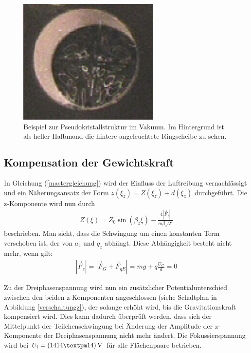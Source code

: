 \documentclass[a4paper,12pt]{article}
\begin{document}
\begin{figure}[htb]
		\centering
		\includegraphics{pseudo_kristall.png}
		\caption{Beispiel zur Pseudokristallstruktur im Vakuum. Im Hintergrund ist als heller Halbmond die hintere angeleuchtete Ringscheibe zu sehen.}
		\label{pseudokristall}
\end{figure}


\subsection{Kompensation der Gewichtskraft}\label{sec:kompensation}
In Gleichung (\ref{mastergleichung}) wird der Einfluss der Luftreibung vernachlässigt und ein Näherungsansatz der Form $z(ξ_z) = Z(ξ_z)+d(ξ_z)$ durchgeführt.
Die z-Komponente wird nun durch
\begin{align*}
	Z(ξ) = Z_0\sin(β_zξ) - \frac{4|\vec{F}_z|}{mβ_zΩ^2}
\end{align*}
beschrieben.
Man sieht, dass die Schwingung um einen konstanten Term verschoben ist, der von $a_z$ und $q_z$ abhängt.
Diese Abhängigkeit besteht nicht mehr, wenn gilt:
\begin{align}
	\label{kraftgleichgew}
	|\vec{F}_{z}| = |\vec{F}_G + \vec{F}_{qE}| = mg + q\frac{U_G}{d} = 0
\end{align}

Zu der Dreiphasenspannung wird nun ein zusätzlicher Potentialunterschied zwischen den beiden z-Komponenten angeschlossen (siehe Schaltplan in Abbildung \ref{verschaltungz}), der solange erhöht wird,
 bis die Gravitationskraft kompensiert wird.
Dies kann dadurch überprüft werden, dass sich der Mittelpunkt der Teilchenschwingung bei Änderung der Amplitude der z-Komponente der Dreiphasenspannung nicht mehr ändert.
Die Fokussierspannung wird bei $U_i = \unit[(1414±14)]{V}$ für alle Flächenpaare betrieben.
\end{document}
